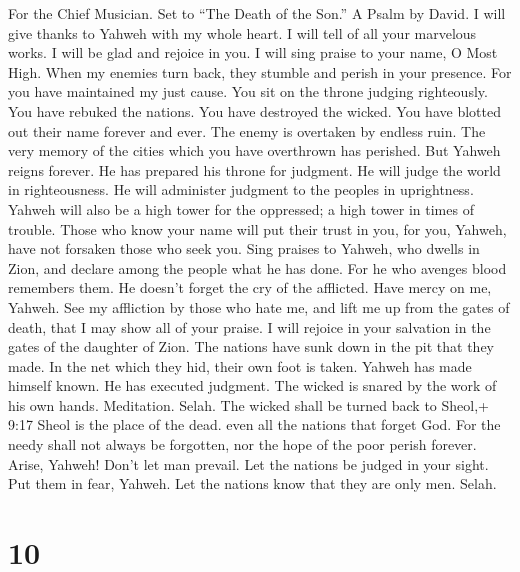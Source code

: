 For the Chief Musician. Set to ``The Death of the Son.'' A Psalm by
David.  I will give thanks to Yahweh with my whole heart. I
will tell of all your marvelous works.  I will be glad and
rejoice in you. I will sing praise to your name, O Most High.
 When my enemies turn back, they stumble and perish in your
presence.  For you have maintained my just cause. You sit on
the throne judging righteously.  You have rebuked the
nations. You have destroyed the wicked. You have blotted out their name
forever and ever.  The enemy is overtaken by endless ruin.
The very memory of the cities which you have overthrown has perished.
 But Yahweh reigns forever. He has prepared his throne for
judgment.  He will judge the world in righteousness. He will
administer judgment to the peoples in uprightness.  Yahweh
will also be a high tower for the oppressed; a high tower in times of
trouble.  Those who know your name will put their trust in
you, for you, Yahweh, have not forsaken those who seek you.
 Sing praises to Yahweh, who dwells in Zion, and declare
among the people what he has done.  For he who avenges
blood remembers them. He doesn't forget the cry of the afflicted.
 Have mercy on me, Yahweh. See my affliction by those who
hate me, and lift me up from the gates of death,  that I
may show all of your praise. I will rejoice in your salvation in the
gates of the daughter of Zion.  The nations have sunk down
in the pit that they made. In the net which they hid, their own foot is
taken.  Yahweh has made himself known. He has executed
judgment. The wicked is snared by the work of his own hands. Meditation.
Selah.  The wicked shall be turned back to Sheol,+ 9:17
Sheol is the place of the dead. even all the nations that forget God.
 For the needy shall not always be forgotten, nor the hope
of the poor perish forever.  Arise, Yahweh! Don't let man
prevail. Let the nations be judged in your sight.  Put them
in fear, Yahweh. Let the nations know that they are only men. Selah.

\hypertarget{section-9}{%
\section{10}\label{section-9}}

